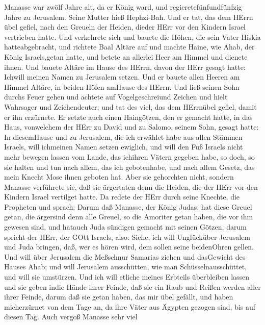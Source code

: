  Manasse war zwölf Jahre alt, da er König ward, und
regieretefünfundfünfzig Jahre zu Jerusalem. Seine Mutter hieß
Hephzi-Bah.  Und er tat, das dem HErrn übel gefiel, nach den
Greueln der Heiden, dieder HErr vor den Kindern Israel vertrieben hatte.
 Und verkehrete sich und bauete die Höhen, die sein Vater
Hiskia hatteabgebracht, und richtete Baal Altäre auf und machte Haine,
wie Ahab, der König Israels,getan hatte, und betete an allerlei Heer am
Himmel und dienete ihnen.  Und bauete Altäre im Hause des
HErrn, davon der HErr gesagt hatte: Ichwill meinen Namen zu Jerusalem
setzen.  Und er bauete allen Heeren am Himmel Altäre, in
beiden Höfen amHause des HErrn.  Und ließ seinen Sohn durchs
Feuer gehen und achtete auf Vogelgeschreiund Zeichen und hielt Wahrsager
und Zeichendeuter; und tat des viel, das dem HErrnübel gefiel, damit er
ihn erzürnete.  Er setzte auch einen Haingötzen, den er
gemacht hatte, in das Haus, vonwelchem der HErr zu David und zu Salomo,
seinem Sohn, gesagt hatte: In diesemHause und zu Jerusalem, die ich
erwählet habe aus allen Stämmen Israels, will ichmeinen Namen setzen
ewiglich,  und will den Fuß Israels nicht mehr bewegen
lassen vom Lande, das ichihren Vätern gegeben habe, so doch, so sie
halten und tun nach allem, das ich gebotenhabe, und nach allem Gesetz,
das mein Knecht Mose ihnen geboten hat.  Aber sie gehorchten
nicht, sondern Manasse verführete sie, daß sie ärgertaten denn die
Heiden, die der HErr vor den Kindern Israel vertilget hatte.
 Da redete der HErr durch seine Knechte, die Propheten und
sprach:  Darum daß Manasse, der König Judas, hat diese
Greuel getan, die ärgersind denn alle Greuel, so die Amoriter getan
haben, die vor ihm gewesen sind, und hatauch Juda sündigen gemacht mit
seinen Götzen,  darum spricht der HErr, der GOtt Israels,
also: Siehe, ich will Unglücküber Jerusalem und Juda bringen, daß, wer
es hören wird, dem sollen seine beidenOhren gellen.  Und
will über Jerusalem die Meßschnur Samarias ziehen und dasGewicht des
Hauses Ahab; und will Jerusalem ausschütten, wie man
Schüsselnausschüttet, und will sie umstürzen.  Und ich will
etliche meines Erbteils überbleiben lassen und sie geben indie Hände
ihrer Feinde, daß sie ein Raub und Reißen werden aller ihrer Feinde,
 darum daß sie getan haben, das mir übel gefällt, und haben
micherzürnet von dem Tage an, da ihre Väter aus Ägypten gezogen sind,
bis auf diesen Tag.  Auch vergoß Manasse sehr viel
